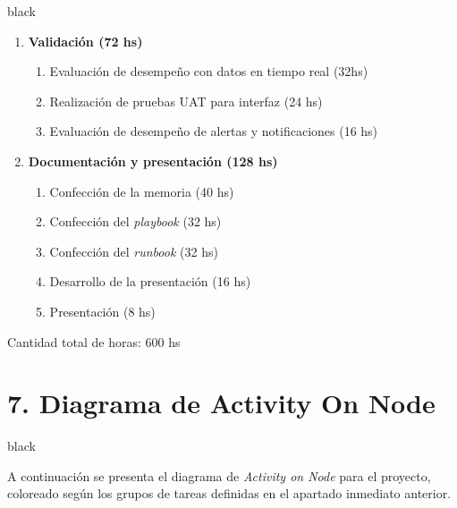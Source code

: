 \documentclass[11pt]{charter}
\begin{document}
\begin{consigna}{black}
\begin{enumerate}
\item \textbf{Validación (72 hs)}
	\begin{enumerate}
	\item Evaluación de desempeño con datos en tiempo real (32hs)
	\item Realización de pruebas UAT para interfaz (24 hs)
	\item Evaluación de desempeño de alertas y notificaciones (16 hs)
	\end{enumerate}

\item \textbf{Documentación y presentación (128 hs)}
	\begin{enumerate}
	\item Confección de la memoria (40 hs)
	\item Confección del \textit{playbook} (32 hs)
	\item Confección del \textit{runbook} (32 hs)
	\item Desarrollo de la presentación (16 hs)
	\item Presentación (8 hs)
	\end{enumerate}
\end{enumerate}

Cantidad total de horas: 600 hs

\end{consigna}

\section{7. Diagrama de Activity On Node}
\label{sec:AoN}
\begin{consigna}{black}

A continuación se presenta el diagrama de \textit{Activity on Node} para el proyecto, coloreado según los grupos de tareas definidas en el apartado inmediato anterior. 
\end{consigna}
\end{document}
